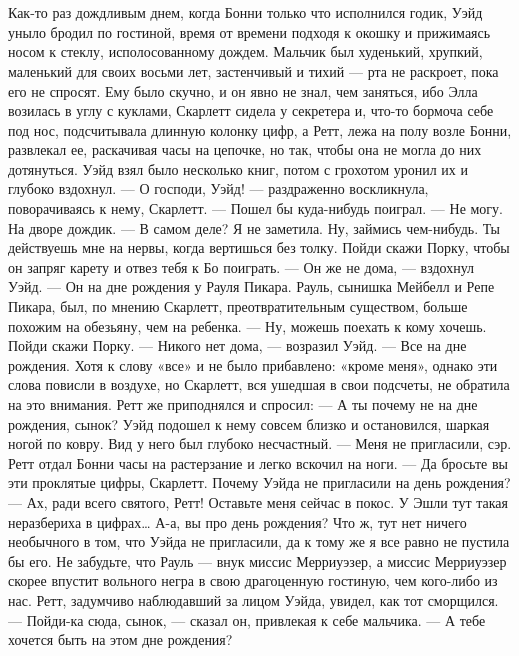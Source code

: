 \chapter{\ }

Как-то раз дождливым днем, когда Бонни только что исполнился годик, Уэйд уныло бродил по гостиной, время от времени подходя к окошку и прижимаясь носом к стеклу, исполосованному дождем. Мальчик был худенький, хрупкий, маленький для своих восьми лет, застенчивый и тихий — рта не раскроет, пока его не спросят. Ему было скучно, и он явно не знал, чем заняться, ибо Элла возилась в углу с куклами, Скарлетт сидела у секретера и, что-то бормоча себе под нос, подсчитывала длинную колонку цифр, а Ретт, лежа на полу возле Бонни, развлекал ее, раскачивая часы на цепочке, но так, чтобы она не могла до них дотянуться.
Уэйд взял было несколько книг, потом с грохотом уронил их и глубоко вздохнул.
— О господи, Уэйд! — раздраженно воскликнула, поворачиваясь к нему, Скарлетт. — Пошел бы куда-нибудь поиграл.
— Не могу. На дворе дождик.
— В самом деле? Я не заметила. Ну, займись чем-нибудь. Ты действуешь мне на нервы, когда вертишься без толку. Пойди скажи Порку, чтобы он запряг карету и отвез тебя к Бо поиграть.
— Он же не дома, — вздохнул Уэйд. — Он на дне рождения у Рауля Пикара.
Рауль, сынишка Мейбелл и Репе Пикара, был, по мнению Скарлетт, преотвратительным существом, больше похожим на обезьяну, чем на ребенка.
— Ну, можешь поехать к кому хочешь. Пойди скажи Порку.
— Никого нет дома, — возразил Уэйд. — Все на дне рождения. Хотя к слову «все» и не было прибавлено: «кроме меня», однако эти слова повисли в воздухе, но Скарлетт, вся ушедшая в свои подсчеты, не обратила на это внимания.
Ретт же приподнялся и спросил:
— А ты почему не на дне рождения, сынок? Уэйд подошел к нему совсем близко и остановился, шаркая ногой по ковру. Вид у него был глубоко несчастный.
— Меня не пригласили, сэр.
Ретт отдал Бонни часы на растерзание и легко вскочил на ноги.
— Да бросьте вы эти проклятые цифры, Скарлетт. Почему Уэйда не пригласили на день рождения?
— Ах, ради всего святого, Ретт! Оставьте меня сейчас в покос. У Эшли тут такая неразбериха в цифрах… А-а, вы про день рождения? Что ж, тут нет ничего необычного в том, что Уэйда не пригласили, да к тому же я все равно не пустила бы его. Не забудьте, что Рауль — внук миссис Мерриуэзер, а миссис Мерриуэзер скорее впустит вольного негра в свою драгоценную гостиную, чем кого-либо из нас.
Ретт, задумчиво наблюдавший за лицом Уэйда, увидел, как тот сморщился.
— Пойди-ка сюда, сынок, — сказал он, привлекая к себе мальчика. — А тебе хочется быть на этом дне рождения?
